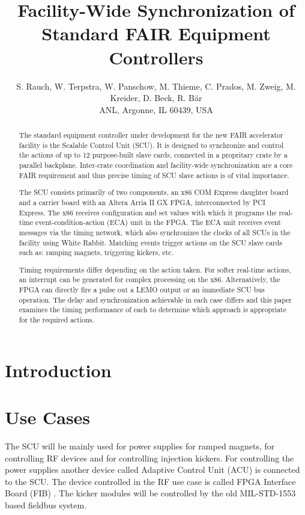 \documentclass{JAC2003}
\begin{document}
\title{Facility-Wide Synchronization of Standard FAIR Equipment Controllers}

\author{
S. Rauch,
W. Terpstra,
W. Panschow,
M. Thieme,
C. Prados,
M. Zweig,
M. Kreider,
D. Beck,
R. B\"ar\\
ANL, Argonne, IL 60439, USA}

\maketitle

\begin{abstract}
The standard equipment controller under development for the new FAIR
accelerator facility is the Scalable Control Unit (SCU). It is designed to
synchronize and control the actions of up to 12 purpose-built slave cards,
connected in a propritary crate by a parallel backplane. Inter-crate
coordination and facility-wide synchronization are a core FAIR requirement
and thus precise timing of SCU slave actions is of vital importance.

The SCU consists primarily of two components, an x86 COM Express daughter
board and a carrier board with an Altera Arria II GX FPGA, interconnected by
PCI Express. The x86 receives configuration and set values with which it
programs the real-time event-condition-action (ECA) unit in the FPGA. The
ECA unit receives event messages via the timing network, which also
synchronizes the clocks of all SCUs in the facility using White Rabbit.
Matching events trigger actions on the SCU slave cards such as: ramping
magnets, triggering kickers, etc.

Timing requirements differ depending on the action taken. For softer
real-time actions, an interrupt can be generated for complex processing on
the x86. Alternatively, the FPGA can directly fire a pulse out a LEMO output
or an immediate SCU bus operation. The delay and synchronization achievable
in each case differs and this paper examines the timing performance of each
to determine which approach is appropriate for the required actions.
\end{abstract}

\section{Introduction}


\section{Use Cases}
The SCU will be mainly used for power supplies for ramped magnets, for controlling
RF devices and for controlling injection kickers.
For controlling the power supplies another device called Adaptive Control Unit (ACU) \cite{acuref} is connected to the SCU. The device controlled in the RF use case is called FPGA Interface Board (FIB) \cite{fibref} . The kicker modules will be controlled by the old MIL-STD-1553 based fieldbus system.
\end{document}
